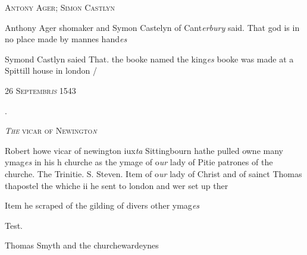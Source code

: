 \documentclass[12pt, a4paper]{book}
\begin{document}
				\begin{center}  {\scshape Antony Ager; Simon Castlyn}  \end{center}
			
               	
               		
		\ifthenelse{\isodd{\thepage}}
		{\reversemarginpar}
		{\normalmarginpar}
		Anthony Ager shomaker and Symon Castelyn of Cant\textit{erbury}
 said. That god is in no place made by mannes hand\textit{es}
               		
		\ifthenelse{\isodd{\thepage}}
		{\reversemarginpar}
		{\normalmarginpar}
		Symond Castlyn saied That. the booke named
               	the king\textit{es} booke was made at a Spittill house in
               		london /
               	
 

            
            
               
				\begin{center} \begin{large} {\scshape 
                  26 Septembr\textit{is} 1543
               } \end{large} \end{center}
			
.
 

                  
				\begin{center}  {\scshape 
                     \textit{The} vicar of Newingto\textit{n}
                  }  \end{center}
			
	
		
			
		
		\ifthenelse{\isodd{\thepage}}
		{\reversemarginpar}
		{\normalmarginpar}
		Robert howe vicar of newington iux\textit{ta} Sittingbourn
  hathe pulled owne many ymag\textit{es} in his h churche
 as the ymage of o\textit{ur} lady of Pitie patrones of the
 churche. The Trinitie. S. Steven. Item of
 o\textit{ur} lady of Christ and of sainct Thomas thapostel
 the whiche ii he sent to london and wer set up ther
		

		\ifthenelse{\isodd{\thepage}}
		{\reversemarginpar}
		{\normalmarginpar}
		Item he scraped of the gilding of divers other ymag\textit{es}

		\ifthenelse{\isodd{\thepage}}
		{\reversemarginpar}
		{\normalmarginpar}
		Test.
		
		\ifthenelse{\isodd{\thepage}}
		{\reversemarginpar}
		{\normalmarginpar}
		Thomas Smyth and the churchewardeynes
 
\end{document}
